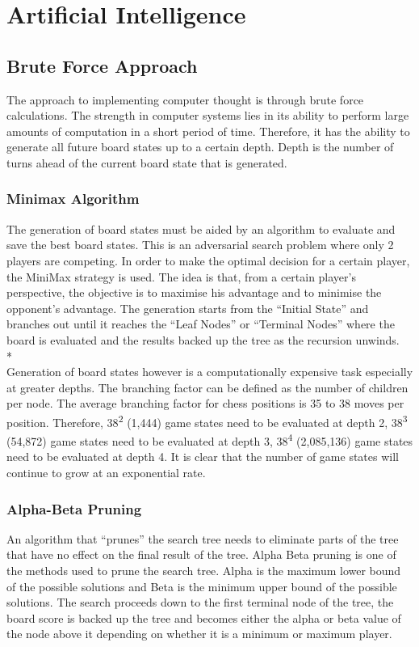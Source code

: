 \documentclass[11pt,a4paper]{article}
\begin{document}
\newpage
\section{Artificial Intelligence}

\subsection{Brute Force Approach}
\indent\indent The approach to implementing computer thought is through brute force calculations. The strength in computer systems lies in its ability to perform large amounts of computation in a short period of time. Therefore, it has the ability to generate all future board states up to a certain depth. Depth is the number of turns ahead of the current board state that is generated. 

\subsubsection{Minimax Algorithm}
\indent\indent The generation of board states must be aided by an algorithm to evaluate and save the best board states. This is an adversarial search problem where only 2 players are competing. In order to make the optimal decision for a certain player, the MiniMax strategy is used. The idea is that, from a certain player’s perspective, the objective is to maximise his advantage and to minimise the opponent’s advantage. The generation starts from the “Initial State” and branches out until it reaches the “Leaf Nodes” or “Terminal Nodes” where the board is evaluated and the results backed up the tree as the recursion unwinds.\cite{chess1}
\\*\\
\indent Generation of board states however is a computationally expensive task especially at greater depths. The branching factor can be defined as the number of children per node. The average branching factor for chess positions is 35 to 38 moves per position.  Therefore, 38\textsuperscript{2} (1,444) game states need to be evaluated at depth 2, 38\textsuperscript{3} (54,872) game states need to be evaluated at depth 3, 38\textsuperscript{4} (2,085,136) game states need to be evaluated at depth 4. It is clear that the number of game states will continue to grow at an exponential rate.\cite{chess2}

\subsubsection{Alpha-Beta Pruning}
\indent\indent An algorithm that “prunes” the search tree needs to eliminate parts of the tree that  have no effect on the final result of the tree. Alpha Beta pruning is one of the methods used to prune the search tree. Alpha is the maximum lower bound of the possible solutions and Beta is the minimum upper bound of the possible solutions. The search proceeds down to the first terminal node of the tree, the board score is backed up the tree and becomes either the alpha or beta value of the node above it depending on whether it is a minimum or maximum player. 
\end{document}
